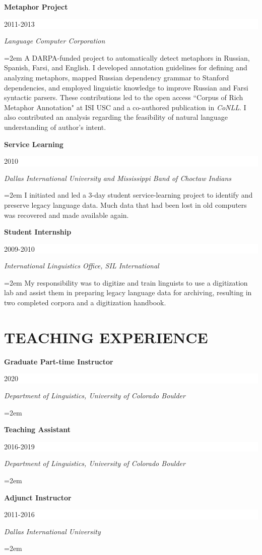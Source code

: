 \documentclass[paper=a4,fontsize=11pt]{article} %
\newcommand{\sepspace}{\vspace*{1em}}		%
\newcommand{\NewPart}[1]{\section*{\uppercase{#1}}}
\newcommand{\EducationEntry}[4]{
		\noindent \textbf{#1} \hfill      %
		\colorbox{White}{%
			\parbox{6em}{%
			\hfill\color{Black}#2}} \par  %
		\noindent \textit{#3} \par        %
		\noindent\hangindent=2em\hangafter=0 \small #4 %
		\normalsize \par}
\newcommand{\WorkEntry}[4]{				  %
		\noindent \textbf{#1} \hfill      %
		\colorbox{White}{%
			\parbox{6em}{%
			\hfill\color{Black}#2}} \par  %
		\noindent \textit{#3} \par              %
		\noindent\hangindent=2em\hangafter=0 \small #4 %
		\normalsize \par}
\begin{document}
\WorkEntry{Metaphor Project}{2011-2013}{Language Computer Corporation}{A DARPA-funded project to automatically detect metaphors in Russian, Spanish, Farsi, and English. I developed annotation guidelines for defining and analyzing metaphors, mapped Russian dependency grammar to Stanford dependencies, and employed linguistic knowledge to improve Russian and Farsi syntactic parsers. These contributions led to the open access ``Corpus of Rich Metaphor Annotation" at ISI USC and a co-authored publication in \textit{CoNLL}. I also contributed an analysis regarding the feasibility of natural language understanding of author's intent.
}
\sepspace

\WorkEntry{Service Learning}{2010}{Dallas International University and Mississippi Band of Choctaw Indians}{I initiated and led a 3-day student service-learning project to identify and preserve legacy language data. Much data that had been lost in old computers was recovered and made available again.}
\sepspace

\WorkEntry{Student Internship}{2009-2010}{International Linguistics Office, SIL International}
{My responsibility was to digitize and train linguists to use a digitization lab and assist them in preparing legacy language data for archiving, resulting in two completed corpora and a digitization handbook.}
\vspace{}

\NewPart{Teaching experience}{}


\WorkEntry{Graduate Part-time Instructor}{2020}{Department of Linguistics, University of Colorado Boulder}{}
\vspace{}

\WorkEntry{Teaching Assistant}{2016-2019}{Department of Linguistics, University of Colorado Boulder}{}
\vspace{}



\WorkEntry{Adjunct Instructor}{2011-2016}{Dallas International University}{}
\vspace{}
\end{document}
